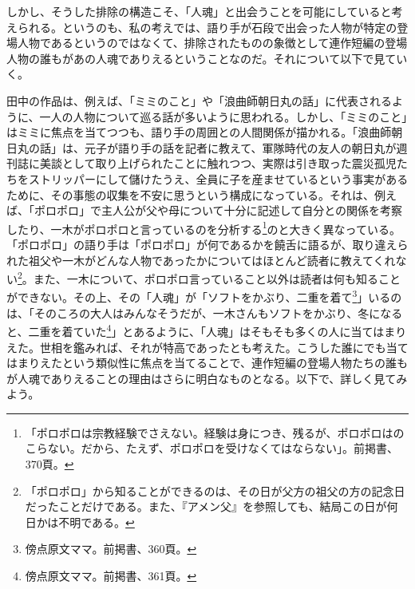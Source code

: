 しかし、そうした排除の構造こそ、「人魂」と出会うことを可能にしていると考えられる。というのも、私の考えでは、語り手が石段で出会った人物が特定の登場人物であるというのではなくて、排除されたものの象徴として連作短編の登場人物の誰もがあの人魂でありえるということなのだ。それについて以下で見ていく。

田中の作品は、例えば、「ミミのこと」や「浪曲師朝日丸の話」に代表されるように、一人の人物について巡る話が多いように思われる。しかし、「ミミのこと」はミミに焦点を当てつつも、語り手の周囲との人間関係が描かれる。「浪曲師朝日丸の話」は、元子が語り手の話を記者に教えて、軍隊時代の友人の朝日丸が週刊誌に美談として取り上げられたことに触れつつ、実際は引き取った震災孤児たちをストリッパーにして儲けたうえ、全員に子を産ませているという事実があるために、その事態の収集を不安に思うという構成になっている。それは、例えば、「ポロポロ」で主人公が父や母について十分に記述して自分との関係を考察したり、一木がポロポロと言っているのを分析する\footnote{「ポロポロは宗教経験でさえない。経験は身につき、残るが、ポロポロはのこらない。だから、たえず、ポロポロを受けなくてはならない」。前掲書、370頁。}のと大きく異なっている。「ポロポロ」の語り手は「ポロポロ」が何であるかを饒舌に語るが、取り違えられた祖父や一木がどんな人物であったかについてはほとんど読者に教えてくれない\footnote{「ポロポロ」から知ることができるのは、その日が父方の祖父の方の記念日だったことだけである。また、『アメン父』を参照しても、結局この日が何日かは不明である。}。また、一木について、ポロポロ言っていること以外は読者は何も知ることができない。その上、その「人魂」が「ソフトをかぶり、二重を着て\footnote{傍点原文ママ。前掲書、360頁。}」いるのは、「そのころの大人はみんなそうだが、一木さんもソフトをかぶり、冬になると、二重を着ていた\footnote{傍点原文ママ。前掲書、361頁。}」とあるように、「人魂」はそもそも多くの人に当てはまりえた。世相を鑑みれば、それが特高であったとも考えた。こうした誰にでも当てはまりえたという類似性に焦点を当てることで、連作短編の登場人物たちの誰もが人魂でありえることの理由はさらに明白なものとなる。以下で、詳しく見てみよう。

